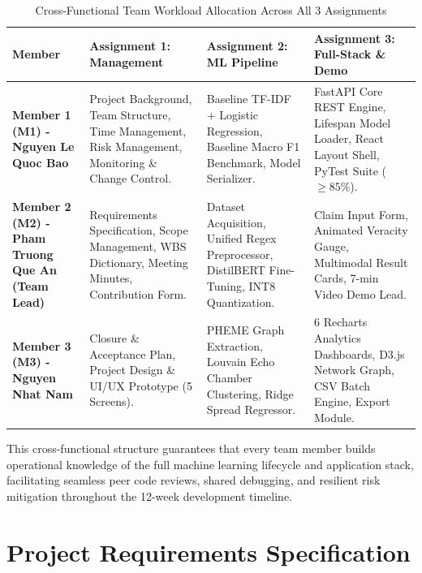 \documentclass[11pt, a4paper]{article}
\begin{document}
\begin{table}[H]
  \centering
  \small
  \caption{Cross-Functional Team Workload Allocation Across All 3 Assignments}
  \label{tab:team-workload}
  \begin{tabularx}{\textwidth}{@{}L{3.5cm} Y Y Y@{}}
    \toprule
    \textbf{Member} & \textbf{Assignment 1: Management} & \textbf{Assignment 2: ML Pipeline} & \textbf{Assignment 3: Full-Stack \& Demo} \\
    \midrule
    \textbf{Member 1 (M1) - Nguyen Le Quoc Bao} &
    Project Background, Team Structure, Time Management, Risk Management, Monitoring \& Change Control. &
    Baseline TF-IDF + Logistic Regression, Baseline Macro F1 Benchmark, Model Serializer. &
    FastAPI Core REST Engine, Lifespan Model Loader, React Layout Shell, PyTest Suite ($\ge 85$\%). \\
    \textbf{Member 2 (M2) - Pham Truong Que An (Team Lead)} &
    Requirements Specification, Scope Management, WBS Dictionary, Meeting Minutes, Contribution Form. &
    Dataset Acquisition, Unified Regex Preprocessor, DistilBERT Fine-Tuning, INT8 Quantization. &
    Claim Input Form, Animated Veracity Gauge, Multimodal Result Cards, 7-min Video Demo Lead. \\
    \textbf{Member 3 (M3) - Nguyen Nhat Nam} &
    Closure \& Acceptance Plan, Project Design \& UI/UX Prototype (5 Screens). &
    PHEME Graph Extraction, Louvain Echo Chamber Clustering, Ridge Spread Regressor. &
    6 Recharts Analytics Dashboards, D3.js Network Graph, CSV Batch Engine, Export Module. \\
    \bottomrule
  \end{tabularx}
\end{table}

This cross-functional structure guarantees that every team member builds operational knowledge of the full machine learning lifecycle and application stack, facilitating seamless peer code reviews, shared debugging, and resilient risk mitigation throughout the 12-week development timeline.

\section{Project Requirements Specification}
\label{sec:requirements}
\end{document}
